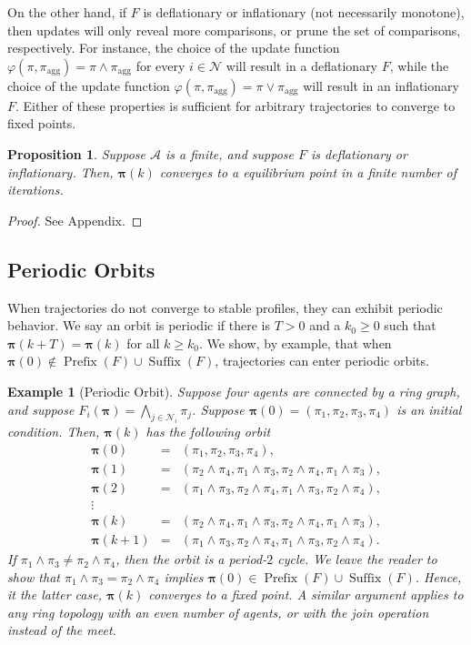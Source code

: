 \documentclass[conference]{ieeeconf}
\newcommand{\N}{\mathcal{N}}
\newcommand{\A}{\mathcal{A}}
\newcommand{\profile}{\boldsymbol{\pi}}
\newcommand{\join}{\vee}
\newcommand{\meet}{\wedge}
\newcommand{\bigmeet}{\bigwedge}
\renewcommand{\geq}{\geqslant}
\DeclareMathOperator{\Pre}{Prefix}
\DeclareMathOperator{\Post}{Suffix}
\newtheorem{proposition}{Proposition}
\newtheorem{example}{Example}
\begin{document}
On the other hand, if $F$ is deflationary or inflationary (not necessarily monotone), then updates will only reveal more comparisons, or prune the set of comparisons, respectively. For instance, the choice of the update function $\varphi(\pi,\pi_{\text{agg}}) = \pi \meet \pi_{\text{agg}}$ for every $i \in \N$ will result in a deflationary $F$, while the choice of the update function 
$\varphi(\pi,\pi_{\text{agg}}) = \pi \join \pi_{\text{agg}}$ will result in an inflationary $F$. Either of these properties is sufficient for arbitrary trajectories to converge to fixed points.

\begin{proposition} \label{prop:inflationary}
     Suppose $\A$ is a finite, and suppose $F$ is deflationary or inflationary. Then, $\profile(k)$ converges to a equilibrium point in a finite number of iterations.
\end{proposition}
\begin{proof}
    See Appendix.
\end{proof}

\subsection{Periodic Orbits}
When trajectories do not converge to stable profiles, they can exhibit periodic behavior. We say an orbit is periodic if there is $T>0$ and a $k_0 \geq 0$ such that $\profile(k+T) = \profile(k)$ for all $k \geq k_0$. We show, by example, that when $\profile(0) \notin \Pre(F) \cup \Post(F)$, trajectories can enter periodic orbits.

\begin{example}[Periodic Orbit]
    Suppose four agents are connected by a ring graph, and suppose $F_i(\profile) = \bigmeet_{j \in \N_i} \pi_j$. Suppose $\profile(0) = (\pi_1,\pi_2,\pi_3,\pi_4)$ is an initial condition. Then, $\profile(k)$ has the following orbit
    \begin{align*}
        \profile(0) &=& \left( \pi_1,\pi_2,\pi_3,\pi_4 \right), \\
        \profile(1) &=& \left( \pi_2 \meet \pi_4, \pi_1 \meet \pi_3, \pi_2 \meet \pi_4, \pi_1 \meet \pi_3 \right), \\
        \profile(2) &=& \left( \pi_1 \meet \pi_3, \pi_2 \meet \pi_4, \pi_1 \meet \pi_3, \pi_2 \meet \pi_4 \right), \\
        \vdots &&  \\
        \profile(k) &=& \left( \pi_2 \meet \pi_4, \pi_1 \meet \pi_3, \pi_2 \meet \pi_4, \pi_1 \meet \pi_3 \right), \\
        \profile(k+1) &=& \left( \pi_1 \meet \pi_3, \pi_2 \meet \pi_4, \pi_1 \meet \pi_3, \pi_2 \meet \pi_4 \right).
    \end{align*}
    If $\pi_1 \meet \pi_3 \neq \pi_2 \meet \pi_4$, then the orbit is a period-$2$ cycle. We leave the reader to show that $\pi_1 \meet \pi_3 = \pi_2 \meet \pi_4$ implies $\profile(0) \in \Pre(F) \cup \Post(F)$. Hence, it the latter case, $\profile(k)$ converges to a fixed point. A similar argument applies to any ring topology with an even number of agents, or with the join operation instead of the meet.
\end{example}
\end{document}

